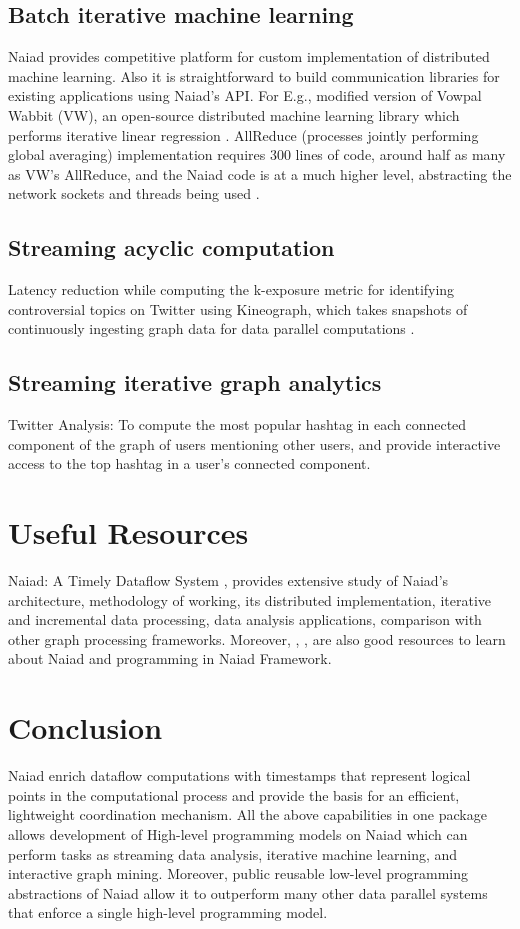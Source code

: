 \documentclass[9pt,twocolumn,twoside]{../../styles/osajnl}
\begin{document}
\subsection{Batch iterative machine learning} Naiad provides competitive platform for custom implementation of distributed machine learning. Also it is straightforward to build communication libraries for existing applications using Naiad’s API. For E.g., modified version of Vowpal Wabbit (VW), an open-source distributed machine learning library which performs iterative linear regression \cite{github-vowpalwabbit}. AllReduce (processes jointly performing global averaging) implementation requires 300 lines of code, around half as many as VW’s AllReduce, and the Naiad code is at a much higher level, abstracting the network sockets and threads being used \cite{paper1-Naiad}.
\subsection{Streaming acyclic computation}
Latency reduction while computing the k-exposure metric for
identifying controversial topics on Twitter using Kineograph, which
takes snapshots of continuously ingesting graph data for data parallel
computations \cite{paper-Kineograph}.
\subsection{Streaming iterative graph analytics}
Twitter Analysis: To compute the most popular hashtag in each
connected component of the graph of users mentioning other users, and
provide interactive access to the top hashtag in a user’s connected
component.

\section{Useful Resources}
Naiad: A Timely Dataflow System \cite{paper1-Naiad}, provides
extensive study of Naiad's architecture, methodology of working, its
distributed implementation, iterative and incremental data processing,
data analysis applications, comparison with other graph processing
frameworks. Moreover, \cite{github-Naiad}, \cite{www-Nuget},
\cite{paper2-Naiad} are also good resources to learn about Naiad and
programming in Naiad Framework.

\section{Conclusion}
Naiad enrich dataflow computations with timestamps that represent
logical points in the computational process and provide the basis for
an efficient, lightweight coordination mechanism. All the above
capabilities in one package allows development of High-level
programming models on Naiad which can perform tasks as streaming data
analysis, iterative machine learning, and interactive graph
mining. Moreover, public reusable low-level programming abstractions
of Naiad allow it to outperform many other data parallel systems that
enforce a single high-level programming model.
\end{document}
